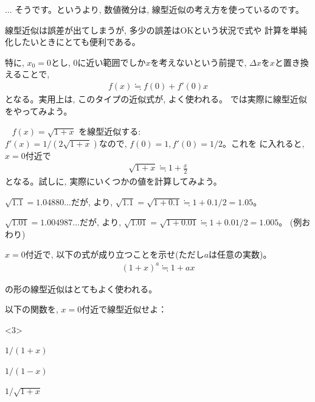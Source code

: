 \begin{faq}{\small{}
... そうです。というより, 数値微分は, 線型近似の考え方を使っているのです。}\end{faq}

線型近似は誤差が出てしまうが, 多少の誤差はOKという状況で式や
計算を単純化したいときにとても便利である。

特に, $x_0=0$とし, 0に近い範囲でしか$x$を考えないという前提で, $\Delta x$を$x$と置き換えることで, 
\begin{eqnarray}
f(x) \fallingdotseq f(0)+f'(0)x\label{eq:linear_approx00}
\end{eqnarray}
となる。実用上は, このタイプの近似式が, よく使われる。
では実際に線型近似をやってみよう。\mv

\begin{exmpl} $\,\,\,\,\,f(x)=\sqrt{1+x}$ を線型近似する:\\
$f'(x)=1/(2\sqrt{1+x})$なので, $f(0)=1, f'(0)=1/2$。これを
に入れると, $x=0$付近で
\begin{eqnarray}
\sqrt{1+x}\fallingdotseq 1+\frac{x}{2}\label{eq:linear_approx01}
\end{eqnarray}
となる。試しに, 実際にいくつかの値を計算してみよう。

$\sqrt{1.1}=1.04880...$だが, より, 
$\sqrt{1.1}=\sqrt{1+0.1}\fallingdotseq1+0.1/2=1.05$。

$\sqrt{1.01}=1.004987...$だが, より, 
$\sqrt{1.01}=\sqrt{1+0.01}\fallingdotseq1+0.01/2=1.005$。
(例おわり)\end{exmpl}
\mv

\begin{q}\label{q:univ_lin_approx0} $x=0$付近で, 以下の式が成り立つことを示せ(ただし$a$は任意の実数)。
\begin{eqnarray}
(1+x)^a\fallingdotseq1+ax\label{eq:linear_approx02}
\end{eqnarray}\end{q}

の形の線型近似はとてもよく使われる。

\begin{q}\label{q:univ_lin_approx2} 以下の関数を, $x=0$付近で線型近似せよ：
\begin{edaenumerate}<3>
\item $1/(1+x)$
\item $1/(1-x)$
\item $1/\sqrt {1+x}$
\end{edaenumerate}\end{q}
\mv

